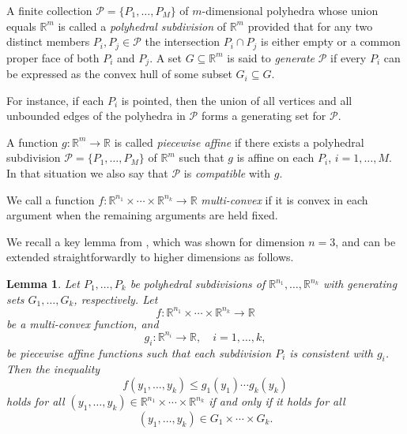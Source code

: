 \documentclass[11pt]{amsart}
\newtheorem{lemma}[thm]{Lemma}
\theoremstyle{definition}
\theoremstyle{remark}
\begin{document}
A finite collection $\mathcal{P} = \{P_1,\dots,P_M\}$ of $m$-dimensional polyhedra whose union equals $\mathbb{R}^m$ is called a \emph{polyhedral subdivision} of $\mathbb{R}^m$ provided that for any two distinct members $P_i, P_j \in \mathcal{P}$ the intersection $P_i \cap P_j$ is either empty or a common proper face of both $P_i$ and $P_j$. A set $G \subseteq \mathbb{R}^m$ is said to \emph{generate} $\mathcal{P}$ if every $P_i$ can be expressed as the convex hull of some subset $G_i \subseteq G$.

For instance, if each $P_i$ is pointed, then the union of all vertices and all unbounded edges of the polyhedra in $\mathcal{P}$ forms a generating set for $\mathcal{P}$.

A function $g : \mathbb{R}^m \to \mathbb{R}$ is called \emph{piecewise affine} if there exists a polyhedral subdivision $\mathcal{P} = \{P_1,\dots,P_M\}$ of $\mathbb{R}^m$ such that $g$ is affine on each $P_i$, $i=1,\dots,M$. In that situation we also say that $\mathcal{P}$ is \emph{compatible} with $g$.


We call a function $f : \mathbb{R}^{n_1} \times \cdots \times \mathbb{R}^{n_k} \to \mathbb{R}$ \emph{multi-convex} if it is convex in each argument when the remaining arguments are held fixed.

We recall a key lemma from \cite{AS}, which was shown for dimension $n=3$, and can be extended straightforwardly to higher dimensions as follows.

\begin{lemma}\label{prop:convex_lemma}
Let $P_1,\ldots,P_k$ be polyhedral subdivisions of $\mathbb{R}^{n_1},\ldots,\mathbb{R}^{n_k}$ with generating sets $G_1,\ldots,G_k$, respectively. Let
\[
f:\mathbb{R}^{n_1}\times\cdots\times\mathbb{R}^{n_k} \to \mathbb{R}
\]
be a multi-convex function, and
\[
g_i:\mathbb{R}^{n_i}\to\mathbb{R}, \quad i=1,\ldots,k,
\]
be piecewise affine functions such that each subdivision $P_i$ is consistent with $g_i$.
Then the inequality
\[
f(y_1,\ldots,y_k) \le g_1(y_1)\cdots g_k(y_k)
\]
holds for all $(y_1,\ldots,y_k)\in \mathbb{R}^{n_1}\times\cdots\times\mathbb{R}^{n_k}$
if and only if it holds for all
\[
(y_1,\ldots,y_k)\in G_1\times\cdots\times G_k.
\]
\end{lemma}
\end{document}
